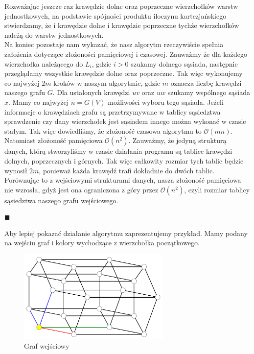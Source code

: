 \documentclass[12pt,a4paper,titlepage]{article}
\newcommand\tab[1][1cm]{\hspace*{#1}}
\begin{document}
Rozważając jeszcze raz krawędzie dolne oraz poprzeczne wierzchołków warstw jednostkowych, na podstawie spójności produktu iloczynu kartezjańskiego stwierdzamy, że i krawędzie dolne i krawędzie poprzeczne tychże wierzchołków należą do warstw jednostkowych.\\

Na koniec pozostaje nam wykazać, że nasz algorytm rzeczywiście spełnia założenia dotyczące złożoności pamięciowej i czasowej. Zauważmy że dla każdego wierzchołka należącego do $L_i$, gdzie $i>0$ szukamy dolnego sąsiada, następnie przeglądamy wszystkie krawędzie dolne oraz poprzeczne. Tak więc wykonujemy co najwyżej $2m$ kroków w naszym algorytmie, gdzie $m$ oznacza liczbę krawędzi naszego grafu $G$. Dla ustalonych krawędzi $uv$ oraz $uw$ szukamy wspólnego sąsiada $x$. Mamy co najwyżej $n=G(V)$ możliwości wyboru tego sąsiada. Jeżeli informacje o krawędziach grafu są przetrzymywane w tablicy sąsiedztwa sprawdzenie czy dany wierzchołek jest sąsiadem innego można wykonać w czasie stałym. Tak więc dowiedliśmy, że złożoność czasowa algorytmu to $\mathcal{O}(mn)$. Natomiast złożoność pamięciowa $\mathcal{O}(n^2)$. Zauważmy, że jedyną strukturą danych, którą stworzyliśmy w czasie działania programu są tablice krawędzi dolnych, poprzecznych i górnych. Tak więc całkowity rozmiar tych tablic będzie wynosił $2m$, ponieważ każda krawędź trafi dokładnie do dwóch tablic. Porównując to z wejściowymi strukturami danych, nasza złożoność pamięciowa nie wzrosła, gdyż jest ona ograniczona z góry przez $\mathcal{O}(n^2)$, czyli rozmiar tablicy sąsiedztwa naszego grafu wejściowego. 
\begin{flushright}
$\blacksquare$
\end{flushright}
\newpage
\tab[0.6cm]Aby lepiej pokazać działanie algorytmu zaprezentujemy przykład. Mamy podany na wejściu graf i kolory wychodzące z wierzchołka początkowego.
\begin{figure}[h]
\centering
\includegraphics[width = 7.5cm]{kol1.png}
\caption{Graf wejściowy}
\end{figure}
\\
\end{document}
